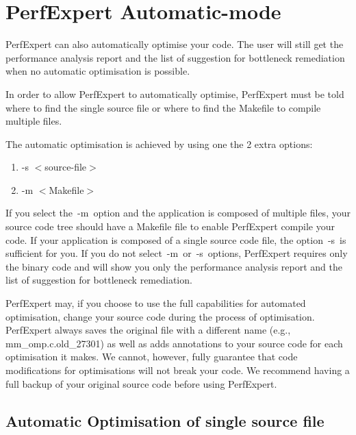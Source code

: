 \section{PerfExpert Automatic-mode}
\label{sec:PerfExpert_Automatic_Mode}


PerfExpert can also automatically optimise your code. The user will still get the performance analysis report and the list of suggestion for bottleneck remediation when no automatic optimisation is possible.

In order to allow PerfExpert to automatically optimise, PerfExpert must be told where to find the single source file or where to find the Makefile to compile multiple files.

The automatic optimisation is achieved by using one the 2 extra options:

\begin{enumerate}
  \item  -s  $<$source-file$>$
  \item  -m  $<$Makefile$>$
\end{enumerate}

If you select the~-m~option and the application is composed of multiple files, your source code tree should have a Makefile file to enable PerfExpert compile your code. If your application is composed of a single source code file, the option~-s~is sufficient for you. If you do not select~-m~or~-s~options, PerfExpert requires only the binary code and will show you only the performance analysis report and the list of suggestion for bottleneck remediation.

 PerfExpert may, if you choose to use the full capabilities for automated optimisation, change your source code during the process of optimisation. PerfExpert always saves the original file with a different name (e.g., mm_omp.c.old\_27301) as well as adds annotations to your source code for each optimisation it makes. We cannot, however, fully guarantee that code modifications for optimisations will not break your code. We recommend having a full backup of your original source code before using PerfExpert.

\subsection{Automatic Optimisation of single source file}
\label{subsec:Automatic_Optimization}

